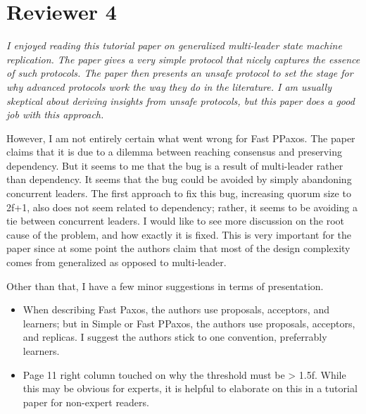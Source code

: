 \documentclass[letterpaper,twocolumn,10pt]{article}
\newenvironment{reviewerquote}
{\list{}{\leftmargin=\parindent\rightmargin=0in}\item[] \itshape \color{ReviewerDarkGray}}%
{\endlist}
\begin{document}
\section*{Reviewer 4}
\begin{reviewerquote}
  I enjoyed reading this tutorial paper on generalized multi-leader state
  machine replication. The paper gives a very simple protocol that nicely
  captures the essence of such protocols. The paper then presents an unsafe
  protocol to set the stage for why advanced protocols work the way they do in
  the literature. I am usually skeptical about deriving insights from unsafe
  protocols, but this paper does a good job with this approach.

  However, I am not entirely certain what went wrong for Fast PPaxos. The paper
  claims that it is due to a dilemma between reaching consensus and preserving
  dependency. But it seems to me that the bug is a result of multi-leader
  rather than dependency. It seems that the bug could be avoided by simply
  abandoning concurrent leaders. The first approach to fix this bug, increasing
  quorum size to 2f+1, also does not seem related to dependency; rather, it
  seems to be avoiding a tie between concurrent leaders. I would like to see
  more discussion on the root cause of the problem, and how exactly it is
  fixed. This is very important for the paper since at some point the authors
  claim that most of the design complexity comes from generalized as opposed to
  multi-leader.

  Other than that, I have a few minor suggestions in terms of presentation.

  \begin{itemize}
    \item
      When describing Fast Paxos, the authors use proposals, acceptors, and
      learners; but in Simple or Fast PPaxos, the authors use proposals,
      acceptors, and replicas. I suggest the authors stick to one convention,
      preferrably learners.
  \end{itemize}

  \begin{itemize}
    \item
      Page 11 right column touched on why the threshold must be > 1.5f. While
      this may be obvious for experts, it is helpful to elaborate on this in a
      tutorial paper for non-expert readers.
  \end{itemize}


\end{reviewerquote}
\end{document}
